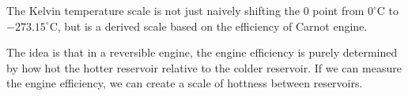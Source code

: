 \documentclass[class=article, crop=false, 12pt]{standalone}
\begin{document}
The Kelvin temperature scale is not just naively shifting the $0$ point from $0^\circ$C to $-273.15^\circ$C,
but is a derived scale based on the efficiency of Carnot engine.

The idea is that in a reversible engine, 
the engine efficiency is purely determined by how hot the hotter reservoir relative to the colder reservoir.
If we can measure the engine efficiency, 
we can create a scale of hottness between reservoirs.

\end{document}
